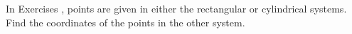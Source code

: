 {\noindent In Exercises} 
{,  points are given in either the rectangular or cylindrical systems. Find the coordinates of the points in the other system.
}
